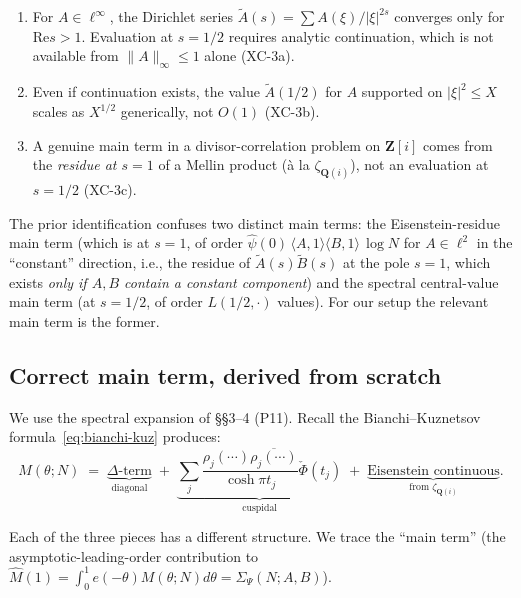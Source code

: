 \documentclass[11pt]{article}
\theoremstyle{definition}
\newcommand{\Z}{\mathbf{Z}}
\newcommand{\Q}{\mathbf{Q}}
\newcommand{\Zi}{\Z[i]}
\renewcommand{\Re}{\mathrm{Re}}
\begin{document}
\begin{enumerate}[label=(\alph*)]
\item For $A\in\ell^\infty$, the Dirichlet series $\widetilde A(s)=\sum A(\xi)/|\xi|^{2s}$ converges only for $\Re s>1$. Evaluation at $s=1/2$ requires analytic continuation, which is not available from $\|A\|_\infty\le 1$ alone (XC-3a).
\item Even if continuation exists, the value $\widetilde A(1/2)$ for $A$ supported on $|\xi|^2\le X$ scales as $X^{1/2}$ generically, not $O(1)$ (XC-3b).
\item A genuine main term in a divisor-correlation problem on $\Zi$ comes from the \emph{residue at $s=1$} of a Mellin product (\`a la $\zeta_{\Q(i)}$), not an evaluation at $s=1/2$ (XC-3c).
\end{enumerate}

The prior identification confuses two distinct main terms: the Eisenstein-residue main term (which is at $s=1$, of order $\widehat\psi(0)\,\langle A,1\rangle\langle B,1\rangle\,\log N$ for $A\in\ell^2$ in the ``constant'' direction, i.e., the residue of $\widetilde A(s)\widetilde B(s)$ at the pole $s=1$, which exists \emph{only if $A,B$ contain a constant component}) and the spectral central-value main term (at $s=1/2$, of order $L(1/2,\cdot)$ values). For our setup the relevant main term is the former.

\subsection{Correct main term, derived from scratch}\label{sec:main-correct}

We use the spectral expansion of \S\S3--4 (P11). Recall the Bianchi--Kuznetsov formula~\eqref{eq:bianchi-kuz} produces:
\[
M(\theta;N)\;=\;\underbrace{\Delta\text{-term}}_{\text{diagonal}}\;+\;\underbrace{\sum_j\frac{\rho_j(\cdots)\overline{\rho_j(\cdots)}}{\cosh\pi t_j}\check\Phi(t_j)}_{\text{cuspidal}}\;+\;\underbrace{\text{Eisenstein continuous}}_{\text{from }\zeta_{\Q(i)}}.
\]

Each of the three pieces has a different structure. We trace the ``main term'' (the asymptotic-leading-order contribution to $\widehat M(1)=\int_0^1 e(-\theta)M(\theta;N)d\theta=\Sigma_\Psi(N;A,B)$).
\end{document}
